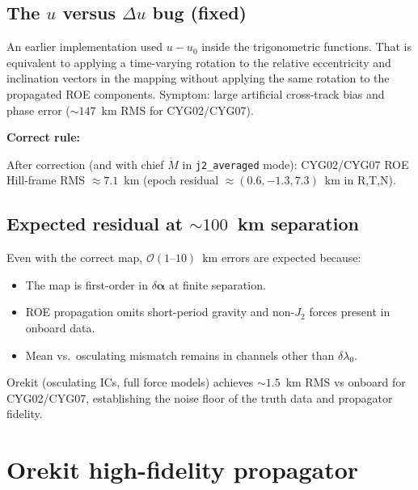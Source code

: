 \documentclass[11pt]{article}
\begin{document}
\subsection{The $u$ versus $\Delta u$ bug (fixed)}

An earlier implementation used $u - u_0$ inside the trigonometric functions. That is equivalent to applying a time-varying rotation to the relative eccentricity and inclination vectors in the mapping without applying the same rotation to the propagated ROE components. Symptom: large artificial cross-track bias and phase error ($\sim 147$~km RMS for CYG02/CYG07).

\textbf{Correct rule:}
\begin{center}
\end{center}

After correction (and with chief $\dot M$ in \texttt{j2\_averaged} mode): CYG02/CYG07 ROE Hill-frame RMS $\approx 7.1$~km (epoch residual $\approx (0.6,-1.3,7.3)$~km in R,T,N).

\subsection{Expected residual at $\sim 100$~km separation}

Even with the correct map, $\mathcal{O}(1\text{--}10)$~km errors are expected because:
\begin{itemize}
    \item The map is first-order in $\delta\bm{\alpha}$ at finite separation.
    \item ROE propagation omits short-period gravity and non-$J_2$ forces present in onboard data.
    \item Mean vs.\ osculating mismatch remains in channels other than $\delta\lambda_0$.
\end{itemize}

Orekit (osculating ICs, full force models) achieves $\sim 1.5$~km RMS vs onboard for CYG02/CYG07, establishing the noise floor of the truth data and propagator fidelity.

\section{Orekit high-fidelity propagator}
\end{document}
